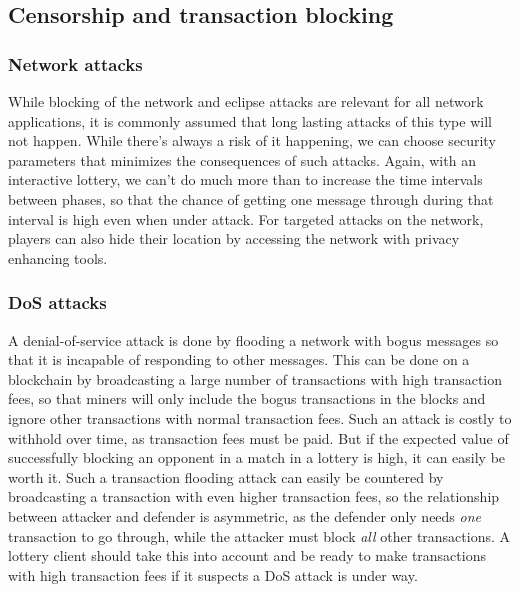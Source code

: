 \subsection{Censorship and transaction blocking}

\subsubsection{Network attacks} While blocking of the network and eclipse attacks are relevant for all network applications, it is commonly assumed that long lasting attacks of this type will not happen. While there's always a risk of it happening, we can choose security parameters that minimizes the consequences of such attacks. Again, with an interactive lottery, we can't do much more than to increase the time intervals between phases, so that the chance of getting one message through during that interval is high even when under attack. For targeted attacks on the network, players can also hide their location by accessing the network with privacy enhancing tools. 

\subsubsection{DoS attacks}
A denial-of-service attack is done by flooding a network with bogus messages so that it is incapable of responding to other messages. This can be done on a blockchain by broadcasting a large number of transactions with high transaction fees, so that miners will only include the bogus transactions in the blocks and ignore other transactions with normal transaction fees. Such an attack is costly to withhold over time, as transaction fees must be paid. But if the expected value of successfully blocking an opponent in a match in a lottery is high, it can easily be worth it. Such a transaction flooding attack can easily be countered by broadcasting a transaction with even higher transaction fees, so the relationship between attacker and defender is asymmetric, as the defender only needs \emph{one} transaction to go through, while the attacker must block \emph{all} other transactions. A lottery client should take this into account and be ready to make transactions with high transaction fees if it suspects a DoS attack is under way.

